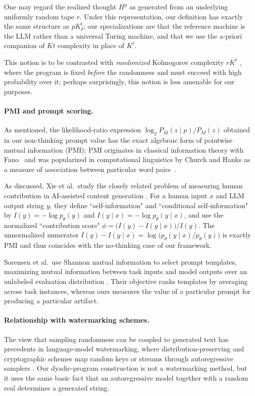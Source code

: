 \documentclass[letterpaper]{article} %
\theoremstyle{definition}
\theoremstyle{remark}
\begin{document}
One may regard the realized thought \(H^y\) as generated from an
underlying uniformly random tape \(r\). Under this representation, our
definition has exactly the same structure as \(pK^t_\delta\); our
specializations are that the reference machine is the LLM rather than a universal Turing machine, and that we use the a-priori companion of $Kt$ complexity in place of $K^t$. 

This notion is to be contrasted with \emph{randomized} Kolmogorov complexity
$rK^t$ \cite{LOS21}, where the program is fixed \emph{before} the randomness
and must succeed with high probability over it; perhaps surprisingly, this notion is less amenable for our purposes.

\paragraph{PMI and prompt scoring.}
As mentioned, the likelihood-ratio expression $\log_2 P_M(z \mid p)/P_M(z)$
obtained in our non-thinking prompt value has the exact
algebraic form of pointwise mutual information (PMI); PMI originates in classical information theory with Fano~\cite{Fano61} and
was popularized in computational linguistics by Church and Hanks as a measure
of association between particular word pairs~\cite{CH90}.

As discussed, Xie et al.\ study the closely related problem of measuring
human contribution in AI-assisted content generation \cite{Xie26}. For a
human input $x$ and LLM output string $y$, they define ``self-information" and
``conditional self-information" by $I(y) = -\log p_\theta(y)$ and
$I(y \mid x) = -\log p_\theta(y \mid x)$, and use the normalized ``contribution
score" $\phi = \bigl( I(y) - I(y \mid x) \bigr) / I(y)$. The unnormalized
numerator $I(y) - I(y \mid x) = \log \bigl( p_\theta(y \mid x)/p_\theta(y)
\bigr)$ is exactly PMI and thus coincides with the no-thinking
case of our framework. 

Sorensen et al.\ use Shannon mutual information to select prompt templates,
maximizing mutual information between task inputs and model outputs over an
unlabeled evaluation distribution \cite{Sorensen22}. Their objective ranks
templates by averaging across task instances, whereas ours measures the value
of a particular prompt for producing a particular artifact.

\paragraph{Relationship with watermarking schemes.}
The view that sampling
randomness can be coupled to generated text has precedents in language-model
watermarking, where distribution-preserving and cryptographic schemes map
random keys or streams through autoregressive samplers
\cite{Kuditipudi23,CGZ24}. Our dyadic-program construction is not a
watermarking method, but it uses the same basic fact that an autoregressive
model together with a random real determines a generated string.
\end{document}
